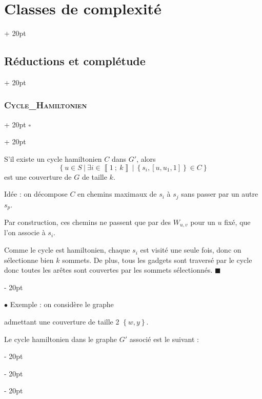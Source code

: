 \documentclass[a4paper, 12pt, twoside]{article}
\newcommand{\nset}[2]{\left\llbracket #1\ ;\ #2 \right\rrbracket}
\newcommand{\set}[1]{\left\{ #1 \right\}}
\newcommand{\ind}[1][20pt]{\advance\leftskip + #1}
\newcommand{\deind}[1][20pt]{\advance\leftskip - #1}
\newenvironment{indt}[2][20pt]{#2 \par \ind[#1]}{\par \deind} %
\newenvironment{proof}[1][{}]{\begin{indt}{$\square$ #1}}{$\blacksquare$ \end{indt}}
\begin{document}
\begin{indt}{\section{Classes de complexité}}
\begin{indt}{\subsection{Réductions et complétude}}
\begin{indt}{\subsubsection{\textsc{Cycle\_Hamiltonien}}}
\begin{proof}
                    \vspace{6pt}
                    
                    \boxed{\Leftarrow} S'il existe un cycle hamiltonien $C$ dans $G'$, alors
                    \[
                        \set{u \in S\ |\ \exists i \in \nset 1 k\ |\ \set{s_i, [u, u_1, 1]} \in C}
                    \]
                    est une couverture de $G$ de taille $k$.

                    Idée : on décompose $C$ en chemins maximaux de $s_i$ à $s_j$ sans passer par un autre $s_p$.

                    Par construction, ces chemins ne passent que par des $W_{u, v}$ pour un $u$ fixé, que l'on associe à $s_i$.

                    Comme le cycle est hamiltonien, chaque $s_i$ est visité une seule fois, donc on sélectionne bien $k$ sommets.
                    De plus, tous les gadgets sont traversé par le cycle donc toutes les arêtes sont couvertes par les sommets sélectionnés.
                \end{proof}

                \vspace{12pt}
                
                $\bullet$ Exemple : on considère le graphe

                \begin{center}
                \end{center}
                admettant une couverture de taille 2 $\set{w, y}$.

                Le cycle hamiltonien dans le graphe $G'$ associé est le suivant :

                \begin{center}
\end{center}
\end{indt}
\end{indt}
\end{indt}
\end{document}
